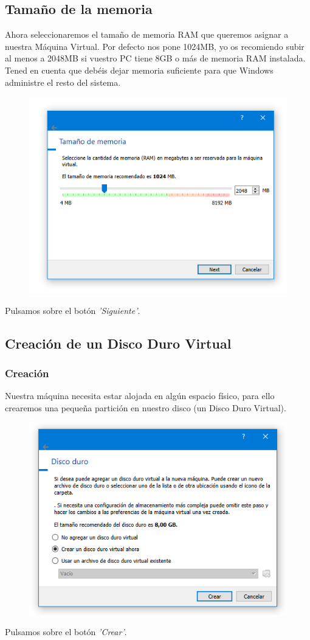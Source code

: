 \subsection{Tamaño de la memoria}
\noindent
Ahora seleccionaremos el tamaño de memoria RAM que queremos asignar a nuestra Máquina Virtual. Por defecto nos pone 1024MB, yo os recomiendo subir al menos a 2048MB si vuestro PC tiene 8GB o más de memoria RAM instalada. Tened en cuenta que debéis dejar memoria suficiente para que Windows administre el resto del sistema.
    \begin{figure}[H]
        \centering
        \includegraphics[width= 0.7 \textwidth]{Media/VB3.png}
    \end{figure}
\newline \noindent Pulsamos sobre el botón \textit{'Siguiente'}.

\subsection{Creación de un Disco Duro Virtual}
\noindent
\subsubsection{Creación}
Nuestra máquina necesita estar alojada en algún espacio físico, para ello crearemos una pequeña partición en nuestro disco (un Disco Duro Virtual).
\begin{figure}[H]
        \centering
        \includegraphics[width= 0.7 \textwidth]{Media/VB4.png}
    \end{figure}
\newline \noindent Pulsamos sobre el botón \textit{'Crear'}.

